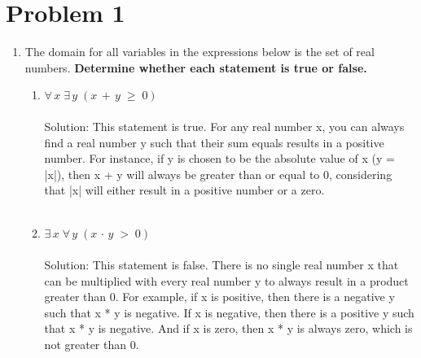 \documentclass{amsart}
\theoremstyle{definition}
\theoremstyle{Exercise}
\theoremstyle{remark}
\theoremstyle{rule}
\numberwithin{equation}{section}
\begin{document}
\section*{Problem 1}
\begin{enumerate}[label=(\alph*)]
\item The domain for all variables in the expressions below is the set of real numbers. {\bf Determine whether each statement is true or false.}
\begin{enumerate}[label=(\roman*)]
  \item $\forall\, x\; \exists \,y\;(x\,+\,y\;\geq \;0)$
\\\\
Solution: This statement is true. For any real number x, you can always find a real number y such that their sum equals results in a positive number. For instance, if y is chosen to be the absolute value of x (y = |x|), then x + y will always be greater than or equal to 0, considering that |x| will either result in a positive number or a zero.
\\\\
  \item $\exists \, x\; \forall \,y\;(x\,\cdot\,y\;>\; 0)$
   \\\\
Solution: This statement is false. There is no single real number x that can be multiplied with every real number y to always result in a product greater than 0. For example, if x is positive, then there is a negative y such that x * y is negative. If x is negative, then there is a positive y such that x * y is negative. And if x is zero, then x * y is always zero, which is not greater than 0.
\\\\
\end{enumerate}


\end{enumerate}
\end{document}
